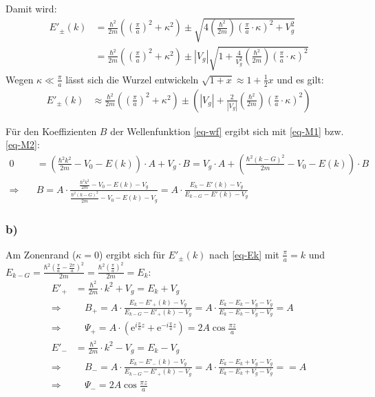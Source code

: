Damit wird:
\begin{align}
\nonumber
  E'_\pm(k) &=\frac{\hbar^2}{2 m}\left(\left(\frac{\pi}{a}\right)^2 + \kappa^2\right)
  \pm \sqrt{4 \left(\frac{\hbar^2}{2 m}\right) \left(\frac{\pi}{a}\cdot \kappa \right)^2 + V_g^2}\\
\label{eq-Ek}
  & = \frac{\hbar^2}{2 m}\left(\left(\frac{\pi}{a}\right)^2 + \kappa^2\right)
  \pm |V_g|\sqrt{1 + \frac{4}{V_g^2}\left(\frac{\hbar^2}{2 m}\right) \left(\frac{\pi}{a}\cdot \kappa \right)^2 }
\end{align}
Wegen $\kappa \ll \frac{\pi}{a}$ lässt sich die Wurzel entwickeln
$\sqrt{1 + x} \approx 1 + \frac{1}{2}x$ und es gilt:
\begin{align}
  E'_\pm(k) &\approx \frac{\hbar^2}{2 m}\left(\left(\frac{\pi}{a}\right)^2 + \kappa^2\right)
  \pm  \left(|V_g| + \frac{2}{|V_g|}\left(\frac{\hbar^2}{2 m}\right) \left(\frac{\pi}{a}\cdot \kappa \right)^2 \right)
\end{align}

Für den Koeffizienten $B$ der Wellenfunktion \eqref{eq-wf} ergibt sich mit \eqref{eq-M1} bzw. \eqref{eq-M2}:
\begin{align}
\nonumber
0 &= \left(\frac{\hbar^2k^2}{2m}-V_0-E(k)\right)\cdot  A + V_g \cdot B =
V_g \cdot A + \left(\frac{\hbar^2(k-G)^2}{2m}-V_0-E(k)\right) \cdot B \\
\Rightarrow \quad & B = A \cdot \frac{\frac{\hbar^2k^2}{2m}-V_0-E(k)-V_g}
   {\frac{\hbar^2(k-G)^2}{2m}-V_0-E(k)-V_g}
= A \cdot \frac{E_k - E'(k)-V_g}{E_{k-G} - E'(k)-V_g}
\end{align}

\subsubsection*{b)}
Am Zonenrand ($\kappa = 0$) ergibt sich für $E'_\pm(k)$ nach \eqref{eq-Ek}
mit $\frac{\pi}{a} = k$ und $E_{k-G} = \frac{\hbar^2(\frac{\pi}{a}-\frac{2\pi}{a})^2}{2m} = \frac{\hbar^2(\frac{\pi}{a})^2}{2m} = E_k$:
\begin{align*}
  E'_+ &= \frac{\hbar^2}{2 m} \cdot k^2 + V_g  = E_k + V_g \\
\Rightarrow & \quad  B_+ = A \cdot \frac{E_k - E'_+(k) - V_g}{E_{k-G}  - E'_+(k) - V_g} =
  A \cdot \frac{E_k - E_k - V_g - V_g}{E_{k}  - E_k - V_g - V_g} =
  A \\
\Rightarrow & \quad  \Psi_+ = A \cdot \left(\mathrm e^{i \frac{\pi}{a} z}
  + \mathrm e^{-i \frac{\pi}{a} z}  \right) =2A\cos{\frac{\pi z}{a}}\\
  E'_- &= \frac{\hbar^2}{2 m} \cdot k^2 - V_g = E_k - V_g \\
\Rightarrow & \quad  B_- = A \cdot \frac{E_k - E'_-(k) - V_g}{E_{k-G}  - E'_+(k) - V_g} =
  A \cdot \frac{E_k - E_k + V_g - V_g}{E_{k}  - E_k + V_g - V_g} =
  = A \\
\Rightarrow & \quad  \Psi_- = 2A\cos{\frac{\pi z}{a}}
\end{align*}


